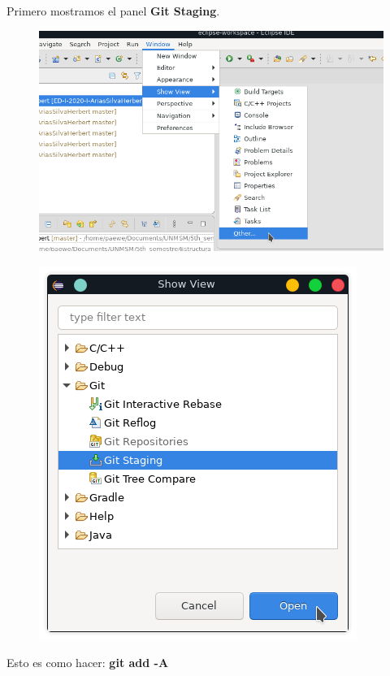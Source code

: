 \documentclass{article}
\begin{document}
Primero mostramos el panel \textbf{Git Staging}.
\begin{figure}[h!]
  \centering
  \includegraphics[scale=0.75]{./Pictures/031_show_view_git_stash.png}
\end{figure}

\begin{figure}[h!]
  \centering
  \includegraphics[scale=0.75]{./Pictures/032_git_staging.png}
\end{figure}

\newpage

Esto es como hacer: \textbf{git add -A}
\end{document}
